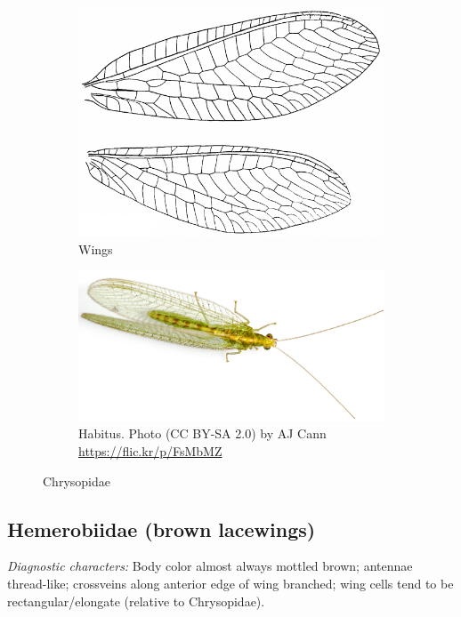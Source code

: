 \documentclass[letterpaper, 11pt]{article}
\begin{document}
\begin{figure}[ht!]
    \centering
    \begin{subfigure}[ht!]{0.38\textwidth}
        \includegraphics[width=\textwidth]{ChrysopidWing}
        \caption{Wings \citep[][Fig. 186]{comstock1918wings}}
        \label{fig:chrysopid1}
    \end{subfigure}
    \qquad
    \begin{subfigure}[ht!]{0.5\textwidth}
        \includegraphics[width=\textwidth]{ChrysopidHabitus}
        \caption{Habitus. Photo (CC BY-SA 2.0) by AJ Cann \url{https://flic.kr/p/FsMbMZ}}
        \label{fig:chrysopid2}
    \end{subfigure}
    \caption{Chrysopidae}\label{fig:chrysopids}
\end{figure}

\subsection{Hemerobiidae (brown lacewings)}
\noindent{}\textit{Diagnostic characters:} Body color almost always mottled brown; antennae thread-like; crossveins along anterior edge of wing branched; wing cells tend to be rectangular/elongate (relative to Chrysopidae).\\
\end{document}

